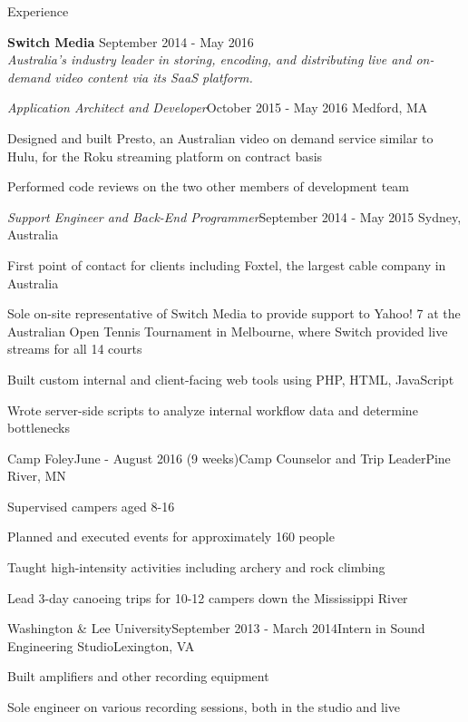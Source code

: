 \documentclass{resume}
\begin{document}
  \begin{rSection}{Experience}
    
    {\bf Switch Media} \hfill { September 2014 - May 2016}\\ 
    {\em Australia's industry leader in storing, encoding, and distributing live and on-demand video content via its SaaS platform.} 
    
 \begin{addmargin}[2em]{0em}   
 
   \begin{rSubsection}{\em Application Architect and Developer}{October 2015 - May 2016}{ }{\hfill Medford, MA}
    \item Designed and built Presto, an Australian video on demand service similar to Hulu, for the Roku streaming platform on contract basis
    \item Performed code reviews on the two other members of development team
    \end{rSubsection}
    
   \begin{rSubsection}{\em Support Engineer and Back-End Programmer}{September 2014 - May 2015}{ }{Sydney, Australia}
    \item First point of contact for clients including Foxtel, the largest cable company in Australia
    \item Sole on-site representative of Switch Media to provide support to Yahoo! 7 at the Australian Open Tennis Tournament in Melbourne, where Switch provided live streams for all 14 courts
    \item Built custom internal and client-facing web tools using PHP, HTML, JavaScript
    \item Wrote server-side scripts to analyze internal workflow data and determine bottlenecks
    \end{rSubsection}
\end{addmargin}  
  
    \begin{rSubsection}{Camp Foley}{June - August 2016 (9 weeks)}{Camp Counselor and Trip Leader}{Pine River, MN}
    \item Supervised campers aged 8-16
    \item Planned and executed events for approximately 160 people
    \item Taught high-intensity activities including archery and rock climbing
    \item Lead 3-day canoeing trips for 10-12 campers down the Mississippi River
    \end{rSubsection}

    \begin{rSubsection}{Washington \& Lee University}{September 2013 - March 2014}{Intern in Sound Engineering Studio}{Lexington, VA}
    \item Built amplifiers and other recording equipment
    \item Sole engineer on various recording sessions, both in the studio and live
    \end{rSubsection}
  
  \end{rSection}
  
\end{document}
